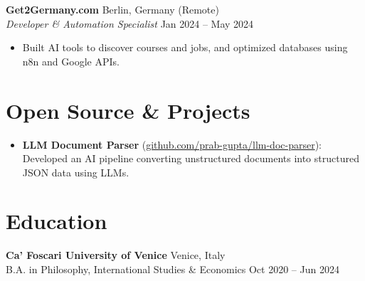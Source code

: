 \documentclass[10pt,a4paper]{article}
\begin{document}
\textbf{Get2Germany.com} \hfill Berlin, Germany (Remote) \\
\textit{Developer \& Automation Specialist} \hfill Jan 2024 -- May 2024
\begin{itemize}
    \item Built AI tools to discover courses and jobs, and optimized databases using n8n and Google APIs.
\end{itemize}

\section*{Open Source \& Projects}
\begin{itemize}
    \item \textbf{LLM Document Parser} (\href{https://github.com/prab-gupta/llm-doc-parser}{github.com/prab-gupta/llm-doc-parser}): Developed an AI pipeline converting unstructured documents into structured JSON data using LLMs.
\end{itemize}

\section*{Education}
\textbf{Ca' Foscari University of Venice} \hfill Venice, Italy \\
B.A. in Philosophy, International Studies \& Economics \hfill Oct 2020 -- Jun 2024
\end{document}

